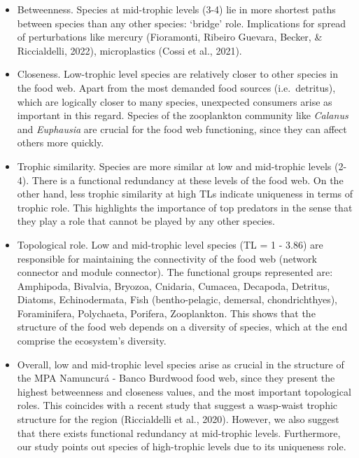 \documentclass[preprint, 3p,
authoryear]{elsarticle} %
\begin{document}
\begin{itemize}
\item
  Betweenness. Species at mid-trophic levels (3-4) lie in more shortest
  paths between species than any other species: `bridge' role.
  Implications for spread of perturbations like mercury (Fioramonti,
  Ribeiro Guevara, Becker, \& Riccialdelli, 2022), microplastics (Cossi
  et al., 2021).
\item
  Closeness. Low-trophic level species are relatively closer to other
  species in the food web. Apart from the most demanded food sources
  (i.e.~detritus), which are logically closer to many species,
  unexpected consumers arise as important in this regard. Species of the
  zooplankton community like \emph{Calanus} and \emph{Euphausia} are
  crucial for the food web functioning, since they can affect others
  more quickly.
\item
  Trophic similarity. Species are more similar at low and mid-trophic
  levels (2-4). There is a functional redundancy at these levels of the
  food web. On the other hand, less trophic similarity at high TLs
  indicate uniqueness in terms of trophic role. This highlights the
  importance of top predators in the sense that they play a role that
  cannot be played by any other species.
\item
  Topological role. Low and mid-trophic level species (TL = 1 - 3.86)
  are responsible for maintaining the connectivity of the food web
  (network connector and module connector). The functional groups
  represented are: Amphipoda, Bivalvia, Bryozoa, Cnidaria, Cumacea,
  Decapoda, Detritus, Diatoms, Echinodermata, Fish (bentho-pelagic,
  demersal, chondrichthyes), Foraminifera, Polychaeta, Porifera,
  Zooplankton. This shows that the structure of the food web depends on
  a diversity of species, which at the end comprise the ecosystem's
  diversity.
\item
  Overall, low and mid-trophic level species arise as crucial in the
  structure of the MPA Namuncurá - Banco Burdwood food web, since they
  present the highest betweenness and closeness values, and the most
  important topological roles. This coincides with a recent study that
  suggest a wasp-waist trophic structure for the region (Riccialdelli et
  al., 2020). However, we also suggest that there exists functional
  redundancy at mid-trophic levels. Furthermore, our study points out
  species of high-trophic levels due to its uniqueness role.
\end{itemize}
\end{document}
